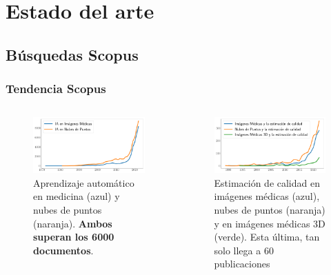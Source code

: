 \section{Estado del arte}
\subsection{Búsquedas Scopus}
\begin{frame}
    \frametitle{Tendencia Scopus}
    \begin{columns}
      \begin{figure}
        \begin{center}
          \includegraphics[width=\textwidth]{imagenes/chapter2/ScopusMLinMedicineAndPC}
        \end{center}
        \caption{Aprendizaje automático en medicina (azul) y nubes de puntos (naranja).
        \textbf{Ambos superan los 6000 documentos}.}
      \end{figure}
      
      \begin{figure}
        \begin{center}
          \includegraphics[width=\textwidth]{imagenes/chapter2/ScopusQualityAssessment}
        \end{center}
        \caption{Estimación de calidad en imágenes médicas (azul), nubes de puntos (naranja) 
          y en imágenes médicas 3D (verde). Esta última, tan solo llega a \alert{60 publicaciones}}
      \end{figure}
    \end{columns}
\end{frame}


